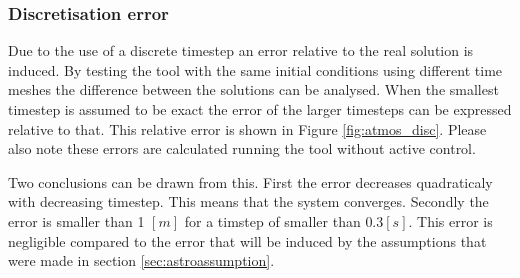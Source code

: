 \subsubsection{Discretisation error}
\label{sec:astrodisc}

Due to the use of a discrete timestep an error relative to the real solution is induced. By testing the tool with the same initial conditions using different time meshes the difference between the solutions can be analysed. When the smallest timestep is assumed to be exact the error of the larger timesteps can be expressed relative to that. This relative error is shown in Figure \ref{fig:atmos_disc}. Please also note these errors are calculated running the tool without active control.

Two conclusions can be drawn from this. First the error decreases quadraticaly with decreasing timestep. This means that the system converges. Secondly the error is smaller than 1 $\left[m\right]$ for a timstep of smaller than $0.3 \left[s\right]$. This error is negligible compared to the error that will be induced by the assumptions that were made in section \ref{sec:astroassumption}.



